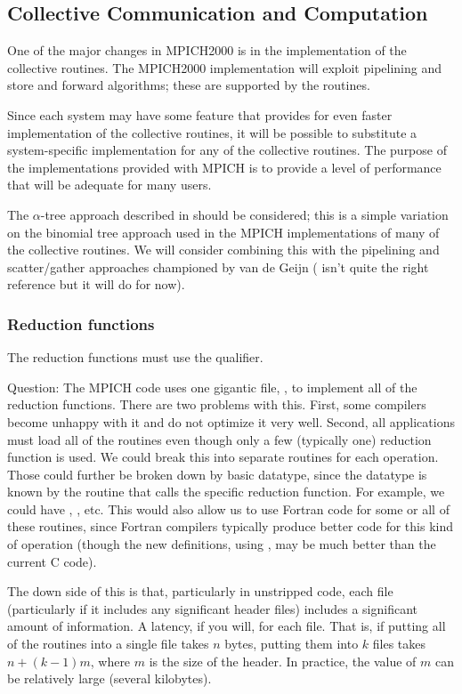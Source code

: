 \documentclass{article}
\begin{document}
\subsection{Collective Communication and Computation}
One of the major changes in MPICH2000 is in the implementation of the
collective routines.  The MPICH2000 implementation will exploit
pipelining and store and forward algorithms; these are supported by
the  routines.  

Since each system may have some feature that provides for even faster
implementation of the collective routines, it will be possible to
substitute a system-specific implementation for any of the collective
routines.  The purpose of the implementations provided with MPICH is
to provide a level of performance that will be adequate
for many users.  

The $\alpha$-tree approach described in
\cite{bern:mpi-collective:hpcn99} should be considered; this is a
simple variation on the binomial tree approach used in the MPICH
implementations of many of the collective routines.  We will consider
combining this with the pipelining and scatter/gather approaches
championed by van de Geijn (\cite{vandegeijn} isn't quite the right
reference but it will do for now).


\subsubsection{Reduction functions}
The reduction functions must use the  qualifier.

Question:
The MPICH code uses one gigantic file, , to implement
all of the reduction functions.  There are two problems with this.
First, some compilers become unhappy with it and do not optimize it
very well.  Second, all applications must load all of the routines
even though only a few (typically one) reduction function is used.  We
could break this into separate routines for each operation.  Those
could further be broken down by basic datatype, since the datatype is
known by the routine that calls the specific reduction function.  
For example, we could have ,
, etc.  This would also allow us to use Fortran
code for some or all of these routines, since Fortran compilers
typically produce better code for this kind of operation (though the
new definitions, using , may be much better than the
current C code).

The down side of this is that, particularly in unstripped code, each
file (particularly if it includes any significant header files)
includes a significant amount of information.  A latency, if you will,
for each file.  That is, if putting all of the routines into a single
file takes $n$ bytes, putting them into $k$ files takes $n + (k-1)m$,
where $m$ is the size of the header.  In practice, the value of $m$ can be
relatively large (several kilobytes).
\end{document}
